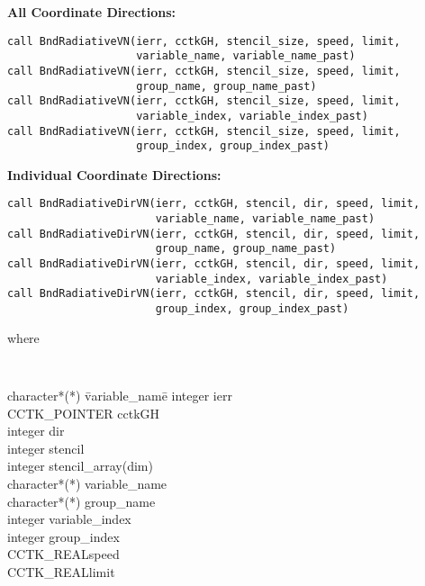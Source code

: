 \documentclass{article}
\begin{document}
{\bf All Coordinate Directions:}
\begin{verbatim}
call BndRadiativeVN(ierr, cctkGH, stencil_size, speed, limit, 
                    variable_name, variable_name_past)
call BndRadiativeVN(ierr, cctkGH, stencil_size, speed, limit, 
                    group_name, group_name_past)
call BndRadiativeVN(ierr, cctkGH, stencil_size, speed, limit, 
                    variable_index, variable_index_past)
call BndRadiativeVN(ierr, cctkGH, stencil_size, speed, limit, 
                    group_index, group_index_past)
\end{verbatim}

{\bf Individual Coordinate Directions:}
\begin{verbatim}
call BndRadiativeDirVN(ierr, cctkGH, stencil, dir, speed, limit, 
                       variable_name, variable_name_past)
call BndRadiativeDirVN(ierr, cctkGH, stencil, dir, speed, limit, 
                       group_name, group_name_past)
call BndRadiativeDirVN(ierr, cctkGH, stencil, dir, speed, limit, 
                       variable_index, variable_index_past)
call BndRadiativeDirVN(ierr, cctkGH, stencil, dir, speed, limit, 
                       group_index, group_index_past)
\end{verbatim}
where
{\tt
\begin{tabbing}
character*(*) \= variable\_name\=\kill
integer \> ierr \\
CCTK\_POINTER \> cctkGH\\
integer \> dir\\
integer \> stencil\\
integer \> stencil\_array(dim)\\
character*(*) \> variable\_name\\
character*(*) \> group\_name\\
integer \> variable\_index\\
integer \> group\_index\\
CCTK\_REAL\>speed\\
CCTK\_REAL\>limit\\
\end{tabbing}
}
\end{document}
